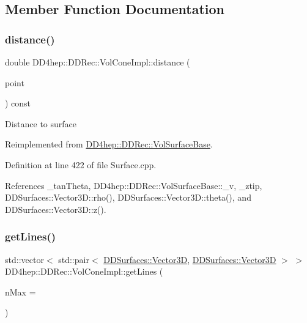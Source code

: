 \subsection{Member Function Documentation}
\hypertarget{class_d_d4hep_1_1_d_d_rec_1_1_vol_cone_impl_af24505f927a05c9d8225609135257f1c}{}\label{class_d_d4hep_1_1_d_d_rec_1_1_vol_cone_impl_af24505f927a05c9d8225609135257f1c} 
\subsubsection{\texorpdfstring{distance()}{distance()}}
{\footnotesize\ttfamily double D\+D4hep\+::\+D\+D\+Rec\+::\+Vol\+Cone\+Impl\+::distance (\begin{DoxyParamCaption}\item[{const \hyperlink{class_d_d_surfaces_1_1_vector3_d}{Vector3D} \&}]{point }\end{DoxyParamCaption}) const\hspace{0.3cm}{\ttfamily [virtual]}}

Distance to surface 

Reimplemented from \hyperlink{class_d_d4hep_1_1_d_d_rec_1_1_vol_surface_base_aefb278e0429219871c47b602a2593fef}{D\+D4hep\+::\+D\+D\+Rec\+::\+Vol\+Surface\+Base}.



Definition at line 422 of file Surface.\+cpp.



References \+\_\+tan\+Theta, D\+D4hep\+::\+D\+D\+Rec\+::\+Vol\+Surface\+Base\+::\+\_\+v, \+\_\+ztip, D\+D\+Surfaces\+::\+Vector3\+D\+::rho(), D\+D\+Surfaces\+::\+Vector3\+D\+::theta(), and D\+D\+Surfaces\+::\+Vector3\+D\+::z().

\hypertarget{class_d_d4hep_1_1_d_d_rec_1_1_vol_cone_impl_ae644bf91eb0b033f16ac4d89d00dd080}{}\label{class_d_d4hep_1_1_d_d_rec_1_1_vol_cone_impl_ae644bf91eb0b033f16ac4d89d00dd080} 
\subsubsection{\texorpdfstring{get\+Lines()}{getLines()}}
{\footnotesize\ttfamily std\+::vector$<$ std\+::pair$<$ \hyperlink{class_d_d_surfaces_1_1_vector3_d}{D\+D\+Surfaces\+::\+Vector3D}, \hyperlink{class_d_d_surfaces_1_1_vector3_d}{D\+D\+Surfaces\+::\+Vector3D} $>$ $>$ D\+D4hep\+::\+D\+D\+Rec\+::\+Vol\+Cone\+Impl\+::get\+Lines (\begin{DoxyParamCaption}\item[{unsigned}]{n\+Max = {} }\end{DoxyParamCaption})\hspace{0.3cm}{\ttfamily [virtual]}}



